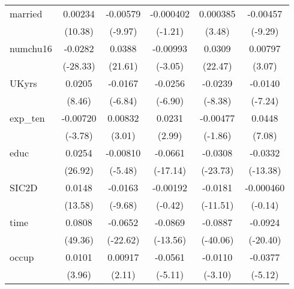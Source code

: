 \begin{table}[htbp]
\begin{tabular}{l*{5}{c}}
married     &     0.00234\sym{***}&    -0.00579\sym{***}&   -0.000402         &    0.000385\sym{***}&    -0.00457\sym{***}\\
            &     (10.38)         &     (-9.97)         &     (-1.21)         &      (3.48)         &     (-9.29)         \\
numchu16    &     -0.0282\sym{***}&      0.0388\sym{***}&    -0.00993\sym{**} &      0.0309\sym{***}&     0.00797\sym{**} \\
            &    (-28.33)         &     (21.61)         &     (-3.05)         &     (22.47)         &      (3.07)         \\
UKyrs       &      0.0205\sym{***}&     -0.0167\sym{***}&     -0.0256\sym{***}&     -0.0239\sym{***}&     -0.0140\sym{***}\\
            &      (8.46)         &     (-6.84)         &     (-6.90)         &     (-8.38)         &     (-7.24)         \\
exp\_ten     &    -0.00720\sym{***}&     0.00832\sym{**} &      0.0231\sym{**} &    -0.00477         &      0.0448\sym{***}\\
            &     (-3.78)         &      (3.01)         &      (2.99)         &     (-1.86)         &      (7.08)         \\
educ        &      0.0254\sym{***}&    -0.00810\sym{***}&     -0.0661\sym{***}&     -0.0308\sym{***}&     -0.0332\sym{***}\\
            &     (26.92)         &     (-5.48)         &    (-17.14)         &    (-23.73)         &    (-13.38)         \\
SIC2D       &      0.0148\sym{***}&     -0.0163\sym{***}&    -0.00192         &     -0.0181\sym{***}&   -0.000460         \\
            &     (13.58)         &     (-9.68)         &     (-0.42)         &    (-11.51)         &     (-0.14)         \\
time        &      0.0808\sym{***}&     -0.0652\sym{***}&     -0.0869\sym{***}&     -0.0887\sym{***}&     -0.0924\sym{***}\\
            &     (49.36)         &    (-22.62)         &    (-13.56)         &    (-40.06)         &    (-20.40)         \\
occup       &      0.0101\sym{***}&     0.00917\sym{*}  &     -0.0561\sym{***}&     -0.0110\sym{**} &     -0.0377\sym{***}\\
            &      (3.96)         &      (2.11)         &     (-5.11)         &     (-3.10)         &     (-5.12)         \\

\end{tabular}
\end{table}
